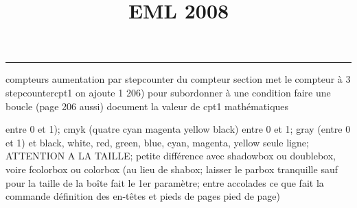 \documentclass[11pt]{article}%
\title{\bf \vspace{-2cm} EML 2008} %
\author{} %
\date{} %
\renewcommand{\headrulewidth}{0pt}%
\renewcommand{\footrulewidth}{0.4pt}%
\begin{document}
\maketitle %
\vspace{-1.4cm}\hrule %
\thispagestyle{fancy}

\vspace*{.2cm}



compteurs%
aumentation par stepcounter du compteur section%
met le compteur à 3%
stepcounter{cpt1} on ajoute 1%
206) pour subordonner à une condition %
faire une boucle (page 206 aussi) %
document la valeur de cpt1 
mathématiques\newcommand{\ch}{\operatorname{ch}} 
\newcommand{\sh}{\operatorname{sh}}
\renewcommand{\tanh}{\operatorname{th}}
\renewcommand{\sinh}{\operatorname{sh}}
\renewcommand{\cosh}{\operatorname{ch}}
\newcommand{\argsh}{\operatorname{argsh}}
\newcommand{\argch}{\operatorname{argch}}
\newcommand{\argth}{\operatorname{argth}}
\newcommand{\Id}{\operatorname{Id}}
\renewcommand{\leq}{\leq}
\renewcommand{\geq}{\geq }

\newcommand{\dlim}{\lim}
\newcommand{\dsum}{\sum}
\newcommand{\dprod}{\prod}



entre 0 et 1); cmyk (quatre cyan magenta yellow black) entre 0 et 1;
gray (entre 0 et 1) et black, white, red, green, blue, cyan, magenta,
yellow%
seule ligne; ATTENTION A LA TAILLE; petite différence avec shadowbox ou
doublebox, voire fcolorbox ou colorbox (au lieu de shabox; laisser le
parbox tranquille sauf pour la taille de la boîte
\newcommand{\Tbox}[1]{\begin{center} \shabox{\parbox{0.6
\linewidth}{#1}} \end{center}} %
fait le 1er paramètre; entre accolades ce que fait la commande
définition des en-têtes et pieds de pages\pagestyle{fancy}
\chead{}
\rfoot[ \ \thepage]{\thepage}
\cfoot{}
\lfoot{}
\thispagestyle{fancy} %
pied de page)\renewcommand{\footrulewidth}{0.4pt}
\renewcommand{\headrulewidth}{0.4pt}
\end{document}
